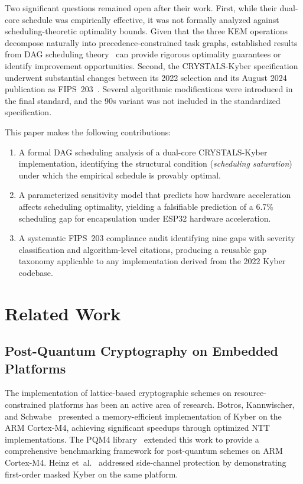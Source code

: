 \documentclass[journal]{IEEEtran}
\begin{document}
Two significant questions remained open after their work. First, while their dual-core schedule was empirically effective, it was not formally analyzed against scheduling-theoretic optimality bounds. Given that the three KEM operations decompose naturally into precedence-constrained task graphs, established results from DAG scheduling theory~\cite{graham1969, kwok1999} can provide rigorous optimality guarantees or identify improvement opportunities. Second, the CRYSTALS-Kyber specification underwent substantial changes between its 2022 selection and its August 2024 publication as FIPS~203~\cite{fips203}. Several algorithmic modifications were introduced in the final standard, and the 90s variant was not included in the standardized specification.

This paper makes the following contributions:
\begin{enumerate}
\item A formal DAG scheduling analysis of a dual-core CRYSTALS-Kyber implementation, identifying the structural condition (\emph{scheduling saturation}) under which the empirical schedule is provably optimal.
\item A parameterized sensitivity model that predicts how hardware acceleration affects scheduling optimality, yielding a falsifiable prediction of a 6.7\% scheduling gap for encapsulation under ESP32 hardware acceleration.
\item A systematic FIPS~203 compliance audit identifying nine gaps with severity classification and algorithm-level citations, producing a reusable gap taxonomy applicable to any implementation derived from the 2022 Kyber codebase.
\end{enumerate}

\section{Related Work}

\subsection{Post-Quantum Cryptography on Embedded Platforms}

The implementation of lattice-based cryptographic schemes on resource-constrained platforms has been an active area of research. Botros, Kannwischer, and Schwabe~\cite{botros2019} presented a memory-efficient implementation of Kyber on the ARM Cortex-M4, achieving significant speedups through optimized NTT implementations. The PQM4 library~\cite{pqm4} extended this work to provide a comprehensive benchmarking framework for post-quantum schemes on ARM Cortex-M4. Heinz et~al.~\cite{heinz2022} addressed side-channel protection by demonstrating first-order masked Kyber on the same platform.
\end{document}
